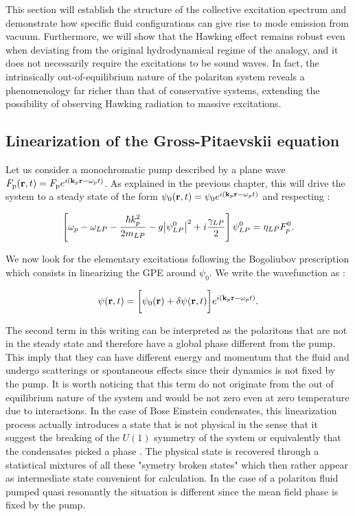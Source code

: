 This section will establish the structure of the collective excitation spectrum and demonstrate how specific fluid configurations can give rise to mode emission from vacuum. Furthermore, we will show that the Hawking effect remains robust even when deviating from the original hydrodynamical regime of the analogy, and it does not necessarily require the excitations to be sound waves. 
In fact, the intrinsically out-of-equilibrium nature of the polariton system reveals a phenomenology far richer than that of conservative systems, extending the possibility of observing Hawking radiation to massive excitations.

\subsection{Linearization of the Gross-Pitaevskii equation}
\label{sec:bogo_modes_derivation}
Let us consider a monochromatic pump described by a plane wave $F_{\mathrm{p}}(\mathbf{r},t)=F_{\mathrm{p}}e^{i(\mathbf{k}_p \mathbf{r} -\omega_pt)}$. As explained in the previous chapter, this will drive the system
to a steady state of the form $\psi_0(\mathbf{r},t)=\psi_0e^{i(\mathbf{k}_p \mathbf{r} -\omega_pt)}$ and respecting :

\begin{equation}
    \left[\omega_p -\omega_{LP} - \dfrac{\hbar k_p^2}{2 m_{LP}} - g \abs{\psi_{LP}^0}^2 + i \dfrac{\gamma_{LP}}{2} \right] \psi_{LP}^0= \eta_{LP} F_p^0.
    \label{eq:steady_state}
\end{equation}

We now look for the elementary excitations following the Bogoliubov prescription which consists in linearizing the GPE around $\psi_0$. We write the wavefunction as :

\begin{equation}
    \psi(\mathbf{r},t)=\biggl[\psi_0(\mathbf{r})+\delta\psi(\mathbf{r},t)\biggr]e^{i(\mathbf{k}_p \mathbf{r} -\omega_pt)}.
    \label{eq:linearization_ansatz}
\end{equation}

The second term in this writing can be interpreted as the polaritons that are not in the steady state and therefore have a global phase different from the pump. 
This imply that they can have different energy and momentum that the fluid and undergo scatterings or spontaneous effects since their dynamics is not fixed by the pump. It is 
worth noticing that this term do not originate from the out of equilibrium nature of the system and would be not zero even at zero temperature due to interactions.
In the case of Bose Einstein condensates, this linearization process actually introduces a state that is not physical in the sense that it suggest the breaking of the $U(1)$ symmetry of the system or equivalently 
 that the condensates picked a phase \cite{castin_bose-einstein_2001}. The physical state is recovered through a statistical mixtures of all these "symetry broken states" which then rather appear 
as intermediate state convenient for calculation. In the case of a polariton fluid pumped quasi resonantly the situation is different since the mean field phase 
is fixed by the pump. 

